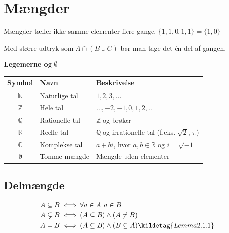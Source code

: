 \section{Mængder}

Mængder tæller ikke samme elementer flere gange. \(\{1,1,0,1,1\} = \{1,0\}\)

Med større udtryk som $A \cap (B \cup C)$ bør man tage det én del af gangen.

\begin{table}[H]
    \centering
    \textbf{Legemerne og} $\emptyset$ \
    \begin{tabular}{c l l}
        \toprule
        \textbf{Symbol} & \textbf{Navn} & \textbf{Beskrivelse} \\
        \midrule
        $\mathbb{N}$ & Naturlige tal & $1, 2, 3, \dots$ \\
        $\mathbb{Z}$ & Hele tal & $\dots, -2, -1, 0, 1, 2, \dots$ \\
        $\mathbb{Q}$ & Rationelle tal & $\mathbb{Z}$ og brøker \\
        $\mathbb{R}$ & Reelle tal & $\mathbb{Q}$ og irrationelle tal (f.eks. $\sqrt{2}$, $\pi$) \\
        $\mathbb{C}$ & Komplekse tal & $a + bi$, hvor $a,b \in \mathbb{R}$ og $i = \sqrt{-1}$ \\
        $\emptyset$ & Tomme mængde & Mængde uden elementer \\
        \bottomrule
    \end{tabular}
\end{table}

\subsection{Delmængde}
\begin{align*}
    A \subseteq B &\iff \forall a \in A, a \in B \\
    A \subsetneq B &\iff (A \subseteq B) \land (A \neq B) \\
    A=B &\iff (A \subseteq B) \land (B \subseteq A) \kildetag{Lemma 2.1.1}
\end{align*}

